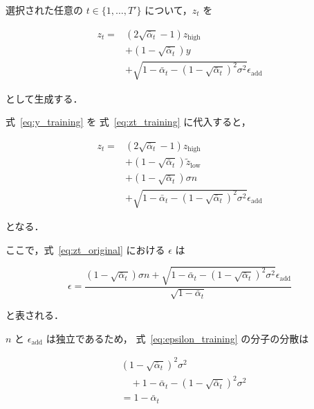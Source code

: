 \documentclass[a4paper,10pt,twocolumn]{ltjsarticle}
\begin{document}
選択された任意の
$t\in\{1,\ldots,T'\}$
について，$z_t$ を

\begin{equation}
\boxed{
\begin{aligned}
z_t
={}&
\left(
2\sqrt{\bar{\alpha}_t}-1
\right)
z_{\mathrm{high}}
\\
&+
\left(
1-\sqrt{\bar{\alpha}_t}
\right)y
\\
&+
\sqrt{
1-\bar{\alpha}_t
-
\left(
1-\sqrt{\bar{\alpha}_t}
\right)^2
\sigma^2
}
\epsilon_{\mathrm{add}}
\end{aligned}
}
\label{eq:zt_training}
\end{equation}

として生成する．

式~\eqref{eq:y_training} を
式~\eqref{eq:zt_training} に代入すると，

\begin{equation}
\begin{aligned}
z_t
={}&
\left(
2\sqrt{\bar{\alpha}_t}-1
\right)
z_{\mathrm{high}}
\\
&+
\left(
1-\sqrt{\bar{\alpha}_t}
\right)
\tilde z_{\mathrm{low}}
\\
&+
\left(
1-\sqrt{\bar{\alpha}_t}
\right)
\sigma n
\\
&+
\sqrt{
1-\bar{\alpha}_t
-
\left(
1-\sqrt{\bar{\alpha}_t}
\right)^2
\sigma^2
}
\epsilon_{\mathrm{add}}
\end{aligned}
\label{eq:zt_training_expanded}
\end{equation}

となる．

ここで，式~\eqref{eq:zt_original} における
$\epsilon$ は

\begin{equation}
\boxed{
\epsilon
=
\frac{
\left(
1-\sqrt{\bar{\alpha}_t}
\right)
\sigma n
+
\sqrt{
1-\bar{\alpha}_t
-
\left(
1-\sqrt{\bar{\alpha}_t}
\right)^2
\sigma^2
}
\epsilon_{\mathrm{add}}
}{
\sqrt{1-\bar{\alpha}_t}
}
}
\label{eq:epsilon_training}
\end{equation}

と表される．

$n$ と $\epsilon_{\mathrm{add}}$ は独立であるため，
式~\eqref{eq:epsilon_training} の分子の分散は

\begin{equation}
\begin{aligned}
&
\left(
1-\sqrt{\bar{\alpha}_t}
\right)^2
\sigma^2
\\
&\quad+
1-\bar{\alpha}_t
-
\left(
1-\sqrt{\bar{\alpha}_t}
\right)^2
\sigma^2
\\
&=
1-\bar{\alpha}_t
\end{aligned}
\label{eq:noise_variance}
\end{equation}
\end{document}
